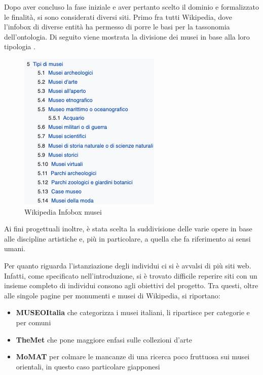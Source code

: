 \documentclass[12pt]{article}
\begin{document}
Dopo aver concluso la fase iniziale e aver pertanto scelto il dominio e formalizzato le finalità, si sono considerati diversi siti. Primo fra tutti Wikipedia, dove l’infobox di diverse entità ha permesso di porre le basi per la tassonomia dell’ontologia.
Di seguito viene mostrata la divisione dei musei in base alla loro tipologia \parencite{infomusei}.

\begin{figure}[!hb]
   \centering
   \includegraphics[scale=0.7]{fig/tassonomia musei wikipedia.png}
   \caption{Wikipedia Infobox musei}\label{fig:picture}
\end{figure}

Ai fini progettuali inoltre, è stata scelta la suddivisione delle varie opere in base alle discipline artistiche e, più in particolare, a quella che fa riferimento ai sensi umani. \parencite{infopere}

Per quanto riguarda l’istanziazione degli individui ci si è avvalsi di più siti web. Infatti, come specificato nell’introduzione, si è trovato difficile reperire siti con un insieme completo di individui consono agli obiettivi del progetto.
Tra questi, oltre alle singole pagine per monumenti e musei di Wikipedia, si riportano: 
\begin{itemize}
 \item \textbf{MUSEOItalia} che categorizza i musei italiani, li ripartisce per categorie e per comuni \parencite{museoitalia}
 \item \textbf{TheMet} che pone maggiore enfasi sulle collezioni d’arte \parencite{themet}
 \item \textbf{MoMAT} per colmare le mancanze di una ricerca poco fruttuosa sui musei orientali, in questo caso particolare giapponesi \parencite{momat}
\end{itemize} 
\end{document}
